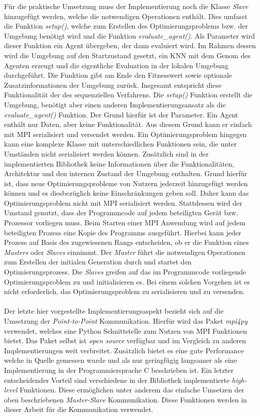 Für die praktische Umsetzung muss der Implementierung noch die Klasse \emph{Slave} hinzugefügt werden, welche die notwendigen Operationen enthält. Dies umfasst die Funktion \emph{setup()}, welche zum Erstellen des Optimierungsproblems bzw. der Umgebung benötigt wird und die Funktion \emph{evaluate\_agent()}. Als Parameter wird dieser Funktion ein Agent übergeben, der dann evaluiert wird. Im Rahmen dessen wird die Umgebung auf den Startzustand gesetzt, ein \ac{KNN} mit dem Genom des Agenten erzeugt und die eigentliche Evaluation in der lokalen Umgebung durchgeführt. Die Funktion gibt am Ende den Fitnesswert sowie optionale Zusatzinformationen der Umgebung zurück. Insgesamt entspricht diese Funktionalität der des sequenziellen Verfahrens. Die \emph{setup()} Funktion erstellt die Umgebung, benötigt aber einen anderen Implementierungsansatz als die \emph{evaluate\_agent()} Funktion. Der Grund hierfür ist der Parameter. Ein Agent enthält nur Daten, aber keine Funktionalität. Aus diesem Grund kann er einfach mit \ac{MPI} serialisiert und versendet werden. Ein Optimierungsproblem hingegen kann eine komplexe Klasse mit unterschiedlichen Funktionen sein, die unter Umständen nicht serialisiert werden können. Zusätzlich sind in der implementierten Bibliothek keine Informationen über die Funktionalitäten, Architektur und den internen Zustand der Umgebung enthalten. Grund hierfür ist, dass neue Optimierungsprobleme von Nutzern jederzeit hinzugefügt werden können und es diesbezüglich keine Einschränkungen geben soll. Daher kann das Optimierungsproblem nicht mit \ac{MPI} serialisiert werden. Stattdessen wird der Umstand genutzt, dass der Programmcode auf jedem beteiligten Gerät bzw. Prozessor vorliegen muss. Beim Starten einer \ac{MPI} Anwendung wird auf jedem beteiligten Prozess eine Kopie des Programms ausgeführt. Hierbei kann jeder Prozess auf Basis des zugewiesenen Rangs entscheiden, ob er die Funktion eines \emph{Masters} oder \emph{Slaves} einnimmt. Der \emph{Master} führt die notwendigen Operationen zum Erstellen der initialen Generation durch und startet den Optimierungsprozess. Die \emph{Slaves} greifen auf das im Programmcode vorliegende Optimierungsproblem zu und initialisieren es. Bei einem solchen Vorgehen ist es nicht erforderlich, das Optimierungsproblem zu serialisieren und zu versenden.
\\\\
Der letzte hier vorgestellte Implementierungsaspekt bezieht sich auf die Umsetzung der \emph{Point-to-Point} Kommunikation. Hierfür wird das Paket \emph{mpi4py} verwendet, welches eine Python Schnittstelle zum Nutzen von \ac{MPI} Funktionen bietet. Das Paket selbst ist \emph{open source} verfügbar und im Vergleich zu anderen Implementierungen weit verbreitet. Zusätzlich bietet es eine gute Performance welche in Quelle \cite{dalcin2008mpi} gemessen wurde und als nur geringfügig langsamer als eine Implementierung in der Programmiersprache C beschrieben ist. Ein letzter entscheidender Vorteil sind verschiedene in der Bibliothek implementierte \emph{high-level} Funktionen. Diese ermöglichen unter anderem das einfache Umsetzen der oben beschriebenen \emph{Master-Slave} Kommunikation. Diese Funktionen werden in dieser Arbeit für die Kommunikation verwendet.
